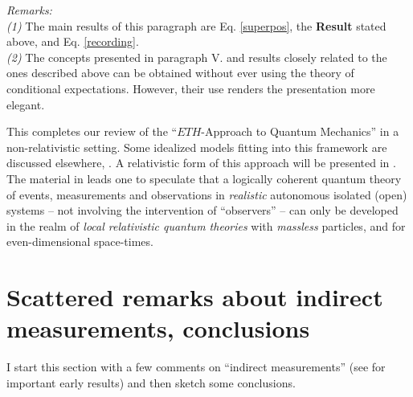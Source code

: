 \documentclass[12pt]{article}
\begin{document}
\begin{enumerate}
{\textit{Remarks:}\\ 
\textit{(1)} The main results of this paragraph are Eq. \eqref{superpos}, the {\bf{Result}} stated above, and Eq. \eqref{recording}.
\\
\textit{(2)} The concepts presented in paragraph V. and results closely related to the ones described above can be obtained without ever using the theory of conditional expectations. However, their use renders the presentation more elegant.
}
\end{enumerate}
This completes our review of the ``$\textit{ETH}$-Approach to Quantum Mechanics'' in a non-relativistic setting. Some idealized models fitting into this framework are discussed elsewhere, \cite{Les-Diablerets}. A relativistic form of this approach will be presented in \cite{Fr}. The material in \cite{Fr} leads one to speculate that a logically coherent quantum theory of events, measurements and observations in \textit{realistic} autonomous isolated (open) systems -- not involving the intervention of ``observers'' -- can only be developed in the realm of \textit{local relativistic quantum theories} with \textit{massless} particles, and for even-dimensional space-times.

\section{Scattered remarks about indirect measurements, conclusions}
I start this section with a few comments on ``indirect measurements'' (see \cite{Kraus, Maassen-Kummerer} for important early results) and then sketch some conclusions.
\end{document}
